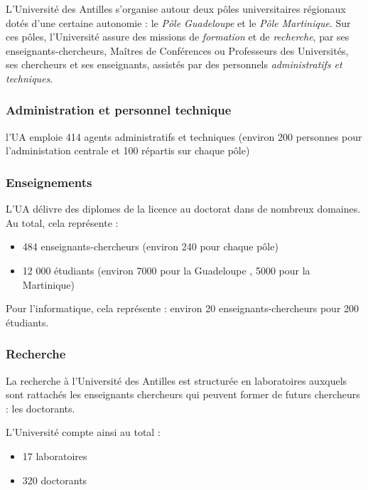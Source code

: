 L'Université des Antilles s'organise autour deux pôles universitaires
régionaux dotés d'une certaine autonomie : le \textit{Pôle Guadeloupe} et le \textit{Pôle Martinique}.
Sur ces pôles, l'Université assure des missions de \emph{formation} et
de \emph{recherche}, par ses enseignants-chercheurs, Maîtres de Conférences ou Professeurs des Universités, ses chercheurs et ses enseignants, assistés par des personnels \emph{administratifs et
techniques}.

\hypertarget{administration-et-personnel-technique}{%
\subsubsection{Administration et personnel
technique}
\label{administration-et-personnel-technique}}

l'UA emploie 414 agents administratifs et techniques (environ 200 personnes
pour l'administation centrale et 100 répartis sur chaque pôle)

\hypertarget{enseignements}{%
\subsubsection{Enseignements}\label{enseignements}}

L'UA délivre des diplomes de la licence au doctorat dans de nombreux
domaines. Au total, cela représente :

\begin{itemize}
\tightlist
\item
  484 enseignants-chercheurs (environ 240 pour chaque pôle)
\item
  12 000 étudiants (environ 7000 pour la Guadeloupe , 5000 pour la
  Martinique)
\end{itemize}

Pour l'informatique, cela représente : environ 20
enseignants-chercheurs pour 200 étudiants.

\hypertarget{recherche}{%
\subsubsection{Recherche}\label{recherche}}

La recherche à l'Université des Antilles est structurée en laboratoires auxquels sont rattachés les
enseignants chercheurs qui peuvent former de futurs chercheurs : les
doctorants.

L'Université compte ainsi au total :

\begin{itemize}
\tightlist
\item
  17 laboratoires
\item
  320 doctorants
\end{itemize}

